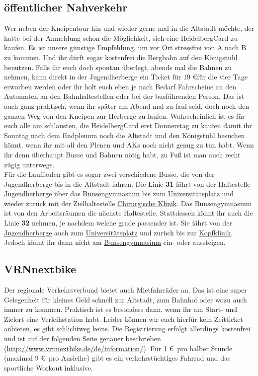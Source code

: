   \subsection{öffentlicher Nahverkehr}
    Wer neben der Kneipentour hin und wieder gerne mal in die Altstadt möchte, der hatte bei
    der Anmeldung schon die Möglichkeit, sich eine HeidelbergCard zu kaufen.
    Es ist unsere günstige Empfehlung, um vor Ort stressfrei von A nach B zu kommen.
    Und ihr dürft sogar kostenfrei die Bergbahn auf den Königstuhl benutzen.
    Falls ihr euch doch spontan überlegt, abends mal die Bahnen zu nehmen, kann
    direkt in der Jugendherberge ein Ticket für 19 \euro für die vier Tage
    erworben werden oder ihr holt euch eben je nach Bedarf Fahrscheine an den Automaten
    an den Bahnhaltestellen oder bei der busführenden Person.
    Das ist auch ganz praktisch, wenn ihr später am Abend mal zu faul seid, doch
    noch den ganzen Weg von den Kneipen zur Herberge zu laufen.
    Wahrscheinlich ist es für euch alle am schlausten, die HeidelbergCard erst
    Donnerstag zu kaufen damit ihr Sonntag nach dem Endplenum noch die Altstadt und
    den Königstuhl besuchen könnt, wenn ihr mit all den Plenen und
    AKs noch nicht genug zu tun habt. Wenn ihr denn überhaupt Busse und Bahnen nötig habt, zu Fuß ist man auch recht zügig unterwegs.\\
    Für die Lauffaulen gibt es sogar zwei verschiedene Busse, die von der Jugendherberge
    bis in die Altstadt fahren. Die Linie \textbf{31} fährt von der Haltestelle
    \underline{Jugendherberge} über das \underline{Bunsengymnasium} bis zum
    \underline{Universitätsplatz} und wieder zurück mit der Zielhaltestelle
    \underline{Chirurgische Klinik}. Das Bunsengymnasium ist von den Arbeitsräumen
    die nächste Haltestelle. Stattdessen könnt ihr auch die Linie \textbf{32} nehmen,
    je nachdem welche grade passender ist. Sie fährt von der \underline{Jugendherberge}
    auch zum \underline{Universitätsplatz} und zurück bis zur \underline{Kopfklinik}.
    Jedoch könnt ihr dann nicht am \underline{Bunsengymnasium} ein- oder aussteigen.

  \subsection{VRNnextbike}
    Der regionale Verkehrsverbund bietet auch Mietfahrräder an. Das ist eine super Gelegenheit
    für kleines Geld schnell zur Altstadt, zum Bahnhof oder wozu auch immer zu kommen.
    Praktisch ist es besonders dann, wenn ihr am Start- und Zielort eine Verleihstation habt.
    Leider können wir euch hierfür kein Zeitticket anbieten, es gibt schlichtweg keins.
    Die Registrierung erfolgt allerdings kostenfrei und ist auf der folgenden Seite
    genauer beschrieben (\url{http://www.vrnnextbike.de/de/information/}).
    Für 1 \euro \, pro halber Stunde (maximal 9 \euro \, pro Ausleihe) gibt es ein verkehrstüchtiges
    Fahrrad und das sportliche Workout inklusive.

